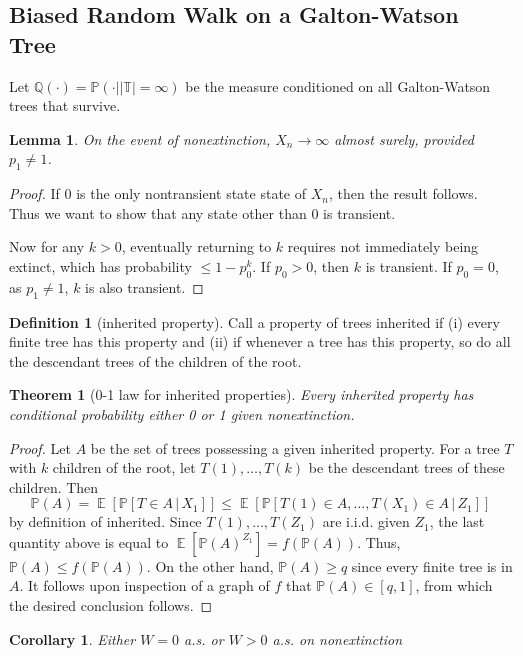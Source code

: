 \documentclass{article}
\newtheorem{Thm}{Theorem}[section]
\newtheorem{Cor}{Corollary}[Thm]
\newtheorem{Lem}{Lemma}[section]
\theoremstyle{definition}
\newtheorem{Def}{Definition}[section]
\newcommand{\EE}{\operatorname{\mathbb{E}}}
\newcommand{\PP}{\mathbb{P}}
\newcommand{\QQ}{\mathbb{Q}}
\newcommand{\TT}{\mathbb{T}}
\renewcommand{\leq}{\leqslant}
\renewcommand{\geq}{\geqslant}
\newcommand{\<}{\left\langle}
\renewcommand{\>}{\right\rangle}
\begin{document}
\subsection{Biased Random Walk on a Galton-Watson Tree}
Let $\QQ(\cdot)=\PP(\cdot||\TT|=\infty)$ be the measure conditioned on all Galton-Watson trees that survive.
\begin{Lem}
    On the event of nonextinction, \(X_n \to \infty\) almost surely, provided \(p_1 \neq 1\).
\end{Lem}
\begin{proof}
    If 0 is the only nontransient state state of $X_n$, then the result follows. Thus we want to show that any state other than 0 is transient.

    Now for any $k>0$, eventually returning to $k$ requires not immediately being extinct, which has probability $\leq 1-p_0^k$.
    If $p_0>0$, then $k$ is transient. If $p_0=0$, as $p_1\neq 1$, $k$ is also transient.
\end{proof}

\begin{Def}[inherited property]
    Call a property of trees inherited if \newline
    (i) every finite tree has this property and \newline 
    (ii) if whenever a tree has this property, so do all the descendant trees of the children of
the root.
\end{Def}
\begin{Thm}[0-1 law for inherited properties]
    Every inherited property has conditional probability either 0 or 1 given
nonextinction.
\end{Thm}
\begin{proof}
    Let \(A\) be the set of trees possessing a given inherited property. For a tree \(T\) with \(k\) children of the root, let \(T(1), \ldots, T(k)\) be the descendant trees of these children. Then
\[
\PP(A) = \EE[\PP[T \in A \,|\, X_1]] \leq \EE[\PP[T(1) \in A, \ldots, T(X_1) \in A \,|\, Z_1]]
\]
by definition of inherited. Since \(T(1), \ldots, T(Z_1)\) are i.i.d. given \(Z_1\), the last quantity above is equal to \(\EE[\PP(A)^{Z_1}] = f(\PP(A))\). 
Thus, \(\PP(A) \leq f(\PP(A))\). On the other hand, \(\PP(A) \geq q\) since every finite tree is in \(A\). 
It follows upon inspection of a graph of \(f\) that \(\PP(A) \in [q, 1]\), from which the desired conclusion follows.
\end{proof}
\begin{Cor}
    Either $W = 0$ a.s. or $W > 0$ a.s. on nonextinction
\end{Cor}
\end{document}
